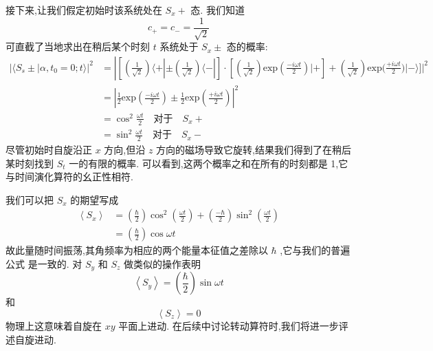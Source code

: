 \documentclass[lang=cn,newtx,10pt,scheme=chinese,thmcnt=section]{elegantbook}
\begin{document}
接下来,让我们假定初始时该系统处在 ${S}_{x} +$ 态. 我们知道
\begin{equation}
	{c}_{ + } = {c}_{ - } = \frac{1}{\sqrt{2}}
\end{equation}
可直截了当地求出在稍后某个时刻 $t$ 系统处于 ${S}_{x} \pm$ 态的概率:
\begin{equation}
	\begin{aligned}
		|\langle S_{s}\pm|\alpha,t_{0}=0;t\rangle|^{2}& = \left|\left[\left(\frac{1}{\sqrt{2}}\right)\langle+|\pm\left(\frac{1}{\sqrt{2}}\right)\langle-|\right.\right]\cdot\left[\left(\frac{1}{\sqrt{2}}\right)\mathrm{exp}\left(\frac{- i \omega t}{2}\right)|+\right] +\left(\frac1{\sqrt{2}}\right)\mathrm{exp}\biggl(\frac{+i\omega t}2\biggr)|-\rangle\biggr]\biggr|^2 \\
		&= \left| \frac{1}{2}\mathrm{exp} \left(\frac{- i \omega t}{2}\right)\pm\frac{1}{2}\mathrm{exp} \left(\frac{+ i \omega t}{2}\right) \right|^{2} \\
		&=\cos^{2}\frac{\omega t}{2}\quad\text{对于}\quad S_{x}+\\
		&=\sin^{2}\frac{\omega t}{2}\quad\text{对于}\quad S_{x}-
	\end{aligned}
\end{equation}
尽管初始时自旋沿正 $x$ 方向,但沿 $z$ 方向的磁场导致它旋转,结果我们得到了在稍后某时刻找到 ${S}_{t}$ 一的有限的概率. 可以看到,这两个概率之和在所有的时刻都是 1,它与时间演化算符的幺正性相符.

我们可以把 ${S}_{x}$ 的期望写成
\begin{equation}
	\begin{aligned}
		\left\langle {S}_{x}\right\rangle &= \left( \frac{\hbar }{2}\right) {\cos }^{2}\left( \frac{\omega t}{2}\right) + \left( \frac{-\hbar }{2}\right) {\sin }^{2}\left( \frac{\omega t}{2}\right)\\
		&= \left( \frac{\hbar }{2}\right) \cos {\omega t}
	\end{aligned}
\end{equation}
故此量随时间振荡,其角频率为相应的两个能量本征值之差除以 $\hbar$ ,它与我们的普遍公式 是一致的. 对 ${S}_{y}$ 和 ${S}_{z}$ 做类似的操作表明
\begin{equation}
	\left\langle {S}_{y}\right\rangle = \left( \frac{\hbar }{2}\right) \sin {\omega t}
\end{equation}
和
\begin{equation}
	\left\langle {S}_{z}\right\rangle = 0
\end{equation}
物理上这意味着自旋在 ${xy}$ 平面上进动. 在后续中讨论转动算符时,我们将进一步评述自旋进动.
\end{document}
